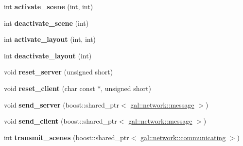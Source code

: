 \begin{DoxyCompactItemize}
\item 
\hypertarget{classNeb_1_1app_aa558ff3c281cd6f6b7bdca7f5a7807ff}{int {\bfseries activate\-\_\-scene} (int, int)}\label{classNeb_1_1app_aa558ff3c281cd6f6b7bdca7f5a7807ff}

\item 
\hypertarget{classNeb_1_1app_a5b1a2bc9d50490f9fce6edf33a910ad5}{int {\bfseries deactivate\-\_\-scene} (int)}\label{classNeb_1_1app_a5b1a2bc9d50490f9fce6edf33a910ad5}

\item 
\hypertarget{classNeb_1_1app_a421f2d98f0857f6d73824740019c94f1}{int {\bfseries activate\-\_\-layout} (int, int)}\label{classNeb_1_1app_a421f2d98f0857f6d73824740019c94f1}

\item 
\hypertarget{classNeb_1_1app_a81e36552d5b9bd439237b8ca7950f82b}{int {\bfseries deactivate\-\_\-layout} (int)}\label{classNeb_1_1app_a81e36552d5b9bd439237b8ca7950f82b}

\item 
\hypertarget{classNeb_1_1app_a88525d86c44907e36e534ffb5d8c9f04}{void {\bfseries reset\-\_\-server} (unsigned short)}\label{classNeb_1_1app_a88525d86c44907e36e534ffb5d8c9f04}

\item 
\hypertarget{classNeb_1_1app_a94908472755f4f20846a75a5368825cb}{void {\bfseries reset\-\_\-client} (char const $\ast$, unsigned short)}\label{classNeb_1_1app_a94908472755f4f20846a75a5368825cb}

\item 
\hypertarget{classNeb_1_1app_a5e164b1f78877b9e82f37fb7ce277619}{void {\bfseries send\-\_\-server} (boost\-::shared\-\_\-ptr$<$ \hyperlink{classgal_1_1network_1_1message}{gal\-::network\-::message} $>$)}\label{classNeb_1_1app_a5e164b1f78877b9e82f37fb7ce277619}

\item 
\hypertarget{classNeb_1_1app_a3b6e10c925c9bb50a3d0046f627df1b7}{void {\bfseries send\-\_\-client} (boost\-::shared\-\_\-ptr$<$ \hyperlink{classgal_1_1network_1_1message}{gal\-::network\-::message} $>$)}\label{classNeb_1_1app_a3b6e10c925c9bb50a3d0046f627df1b7}

\item 
\hypertarget{classNeb_1_1app_a72ee12a8337acc834d944d59917eaf16}{int {\bfseries transmit\-\_\-scenes} (boost\-::shared\-\_\-ptr$<$ \hyperlink{classgal_1_1network_1_1communicating}{gal\-::network\-::communicating} $>$)}\label{classNeb_1_1app_a72ee12a8337acc834d944d59917eaf16}


\end{DoxyCompactItemize}
